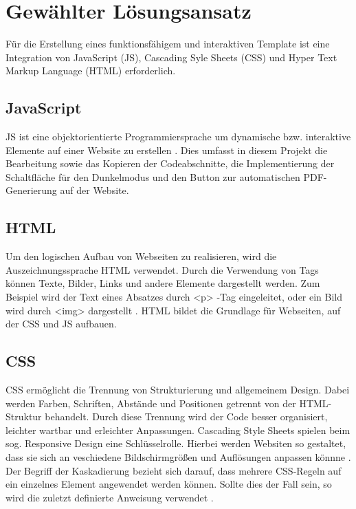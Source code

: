 \documentclass[11pt,a4paper]{report}
\begin{document}
\section{Gewählter Lösungsansatz} \label{sec:time}
Für die Erstellung eines funktionsfähigem und interaktiven Template ist eine Integration von JavaScript (JS), Cascading Syle Sheets (CSS) und Hyper Text Markup Language (HTML) 
erforderlich.

\subsection{JavaScript} \label{sec:JS}
JS ist eine objektorientierte Programmiersprache um dynamische bzw. interaktive Elemente auf einer Website zu erstellen \cite{JS_Tutorial}. Dies umfasst in diesem Projekt die Bearbeitung sowie das Kopieren der Codeabschnitte, die Implementierung der Schaltfläche für den Dunkelmodus und den Button zur automatischen PDF-Generierung auf der Website.

\subsection{HTML} \label{sec:HTML}
Um den logischen Aufbau von Webseiten zu realisieren, wird die Auszeichnungssprache HTML verwendet. Durch die Verwendung von Tags können Texte, Bilder, Links und andere Elemente dargestellt werden. Zum Beispiel wird der Text eines Absatzes durch \glqq <p> \grqq{}-Tag eingeleitet, oder ein Bild wird durch \glqq <img> \grqq{} dargestellt \cite{HTML_Tutorial}. HTML bildet die Grundlage für Webseiten, auf der CSS und JS aufbauen.

\subsection{CSS} \label{sec:CSS}
CSS ermöglicht die Trennung von Strukturierung und allgemeinem Design. Dabei werden Farben, Schriften, Abstände und Positionen getrennt von der HTML-Struktur behandelt. Durch diese Trennung wird der Code besser organisiert, leichter wartbar und erleichter Anpassungen\cite{CSS_Tutorial}. Cascading Style Sheets spielen beim sog. Responsive Design eine Schlüsselrolle. Hierbei werden Websiten so gestaltet, dass sie sich an veschiedene Bildschirmgrößen und Auflösungen anpassen könnne \cite{CSS_Responsive_Design}. Der Begriff der Kaskadierung bezieht sich darauf, dass mehrere CSS-Regeln auf ein einzelnes Element angewendet werden können. Sollte dies der Fall sein, so wird die zuletzt definierte Anweisung verwendet \cite{CSS_Tutorial}.
\end{document}
